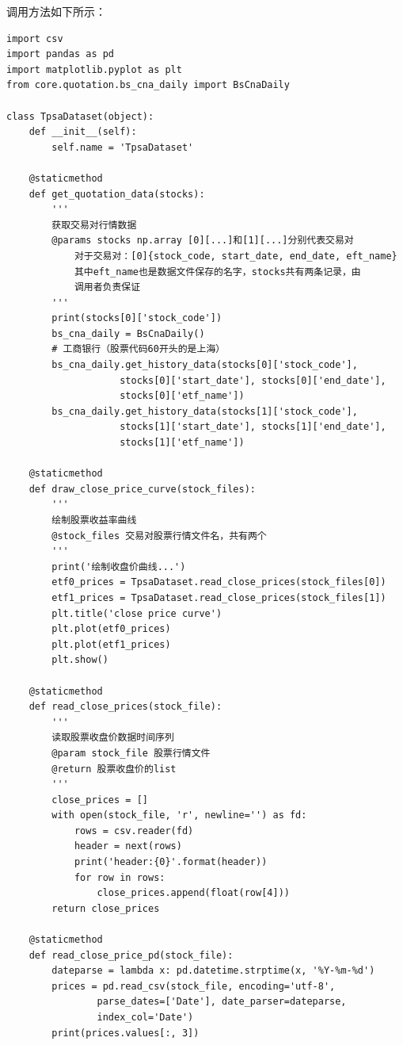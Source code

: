 \documentclass{article}
\begin{document}
调用方法如下所示：
\begin{lstlisting}
import csv
import pandas as pd
import matplotlib.pyplot as plt
from core.quotation.bs_cna_daily import BsCnaDaily

class TpsaDataset(object):
    def __init__(self):
        self.name = 'TpsaDataset'
        
    @staticmethod
    def get_quotation_data(stocks):
        '''
        获取交易对行情数据
        @params stocks np.array [0][...]和[1][...]分别代表交易对
            对于交易对：[0]{stock_code, start_date, end_date, eft_name}
            其中eft_name也是数据文件保存的名字，stocks共有两条记录，由
            调用者负责保证
        '''
        print(stocks[0]['stock_code'])
        bs_cna_daily = BsCnaDaily()
        # 工商银行（股票代码60开头的是上海）
        bs_cna_daily.get_history_data(stocks[0]['stock_code'], 
                    stocks[0]['start_date'], stocks[0]['end_date'], 
                    stocks[0]['etf_name'])
        bs_cna_daily.get_history_data(stocks[1]['stock_code'], 
                    stocks[1]['start_date'], stocks[1]['end_date'], 
                    stocks[1]['etf_name'])
            
    @staticmethod
    def draw_close_price_curve(stock_files):
        '''
        绘制股票收益率曲线
        @stock_files 交易对股票行情文件名，共有两个
        '''
        print('绘制收盘价曲线...')
        etf0_prices = TpsaDataset.read_close_prices(stock_files[0])
        etf1_prices = TpsaDataset.read_close_prices(stock_files[1])
        plt.title('close price curve')
        plt.plot(etf0_prices)
        plt.plot(etf1_prices)
        plt.show()
    
    @staticmethod
    def read_close_prices(stock_file):
        '''
        读取股票收盘价数据时间序列
        @param stock_file 股票行情文件
        @return 股票收盘价的list
        '''
        close_prices = []
        with open(stock_file, 'r', newline='') as fd:
            rows = csv.reader(fd)
            header = next(rows)
            print('header:{0}'.format(header))
            for row in rows:
                close_prices.append(float(row[4]))
        return close_prices
        
    @staticmethod
    def read_close_price_pd(stock_file):
        dateparse = lambda x: pd.datetime.strptime(x, '%Y-%m-%d')
        prices = pd.read_csv(stock_file, encoding='utf-8', 
                parse_dates=['Date'], date_parser=dateparse, 
                index_col='Date')
        print(prices.values[:, 3])
\end{lstlisting}
\end{document}
